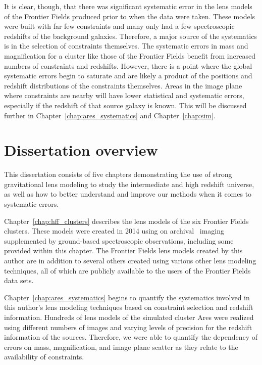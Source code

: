 It is clear, though, that there was significant systematic error in the lens models of the Frontier Fields produced prior to when the data were taken. These models were built with far few constraints and many only had a few spectroscopic redshifts of the background galaxies. Therefore, a major source of the systematics is in the selection of constraints themselves. The systematic errors in mass and magnification for a cluster like those of the Frontier Fields benefit from increased numbers of constraints and redshifts. However, there is a point where the global systematic errors begin to saturate and are likely a product of the positions and redshift distributions of the constraints themselves. Areas in the image plane where constraints are nearby will have lower statistical and systematic errors, especially if the redshift of that source galaxy is known. This will be discussed further in Chapter~\ref{chap:ares_systematics} and Chapter~\ref{chap:sim}.

\section{Dissertation overview}

This dissertation consists of five chapters demonstrating the use of strong gravitational lens modeling to study the intermediate and high redshift universe, as well as how to better understand and improve our methods when it comes to systematic errors.

Chapter~\ref{chap:hff_clusters} describes the lens models of the six Frontier Fields clusters. These models were created in 2014 using on archival \hst\ imaging supplemented by ground-based spectroscopic observations, including some provided within this chapter. The Frontier Fields lens models created by this author are in addition to several others created using various other lens modeling techniques, all of which are publicly available to the users of the Frontier Fields data sets.

Chapter~\ref{chap:ares_systematics} begins to quantify the systematics involved in this author's lens modeling techniques based on constraint selection and redshift information. Hundreds of lens models of the simulated cluster Ares were realized using different numbers of images and varying levels of precision for the redshift information of the sources. Therefore, we were able to quantify the dependency of errors on mass, magnification, and image plane scatter as they relate to the availability of constraints.

